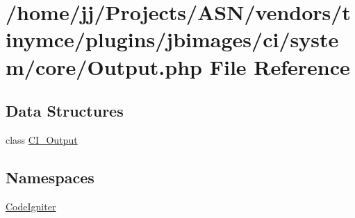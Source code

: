 \hypertarget{_output_8php}{}\section{/home/jj/\+Projects/\+A\+S\+N/vendors/tinymce/plugins/jbimages/ci/system/core/\+Output.php File Reference}
\label{_output_8php}
\subsection*{Data Structures}
\begin{DoxyCompactItemize}
\item 
class \hyperlink{class_c_i___output}{C\+I\+\_\+\+Output}
\end{DoxyCompactItemize}
\subsection*{Namespaces}
\begin{DoxyCompactItemize}
\item 
 \hyperlink{namespace_code_igniter}{Code\+Igniter}
\end{DoxyCompactItemize}
